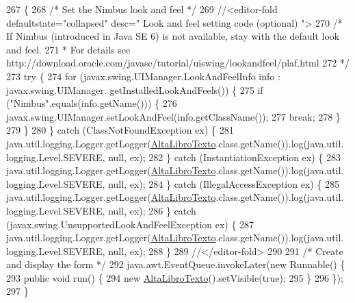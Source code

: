 \begin{DoxyCode}
267                                            \{
268         \textcolor{comment}{/* Set the Nimbus look and feel */}
269         \textcolor{comment}{//<editor-fold defaultstate="collapsed" desc=" Look and feel setting code (optional) ">}
270         \textcolor{comment}{/* If Nimbus (introduced in Java SE 6) is not available, stay with the default look and feel.}
271 \textcolor{comment}{         * For details see http://download.oracle.com/javase/tutorial/uiswing/lookandfeel/plaf.html }
272 \textcolor{comment}{         */}
273         \textcolor{keywordflow}{try} \{
274             \textcolor{keywordflow}{for} (javax.swing.UIManager.LookAndFeelInfo info : javax.swing.UIManager.
      getInstalledLookAndFeels()) \{
275                 \textcolor{keywordflow}{if} (\textcolor{stringliteral}{"Nimbus"}.equals(info.getName())) \{
276                     javax.swing.UIManager.setLookAndFeel(info.getClassName());
277                     \textcolor{keywordflow}{break};
278                 \}
279             \}
280         \} \textcolor{keywordflow}{catch} (ClassNotFoundException ex) \{
281             java.util.logging.Logger.getLogger(\mbox{\hyperlink{class_interfaz_package_1_1_alta_libro_texto_a345a50ec50122a4c6b44dfb0f33a316b}{AltaLibroTexto}}.class.getName()).log(java.util.
      logging.Level.SEVERE, null, ex);
282         \} \textcolor{keywordflow}{catch} (InstantiationException ex) \{
283             java.util.logging.Logger.getLogger(\mbox{\hyperlink{class_interfaz_package_1_1_alta_libro_texto_a345a50ec50122a4c6b44dfb0f33a316b}{AltaLibroTexto}}.class.getName()).log(java.util.
      logging.Level.SEVERE, null, ex);
284         \} \textcolor{keywordflow}{catch} (IllegalAccessException ex) \{
285             java.util.logging.Logger.getLogger(\mbox{\hyperlink{class_interfaz_package_1_1_alta_libro_texto_a345a50ec50122a4c6b44dfb0f33a316b}{AltaLibroTexto}}.class.getName()).log(java.util.
      logging.Level.SEVERE, null, ex);
286         \} \textcolor{keywordflow}{catch} (javax.swing.UnsupportedLookAndFeelException ex) \{
287             java.util.logging.Logger.getLogger(\mbox{\hyperlink{class_interfaz_package_1_1_alta_libro_texto_a345a50ec50122a4c6b44dfb0f33a316b}{AltaLibroTexto}}.class.getName()).log(java.util.
      logging.Level.SEVERE, null, ex);
288         \}
289         \textcolor{comment}{//</editor-fold>}
290 
291         \textcolor{comment}{/* Create and display the form */}
292         java.awt.EventQueue.invokeLater(\textcolor{keyword}{new} Runnable() \{
293             \textcolor{keyword}{public} \textcolor{keywordtype}{void} run() \{
294                 \textcolor{keyword}{new} \mbox{\hyperlink{class_interfaz_package_1_1_alta_libro_texto_a345a50ec50122a4c6b44dfb0f33a316b}{AltaLibroTexto}}().setVisible(\textcolor{keyword}{true});
295             \}
296         \});
297     \}
\end{DoxyCode}


